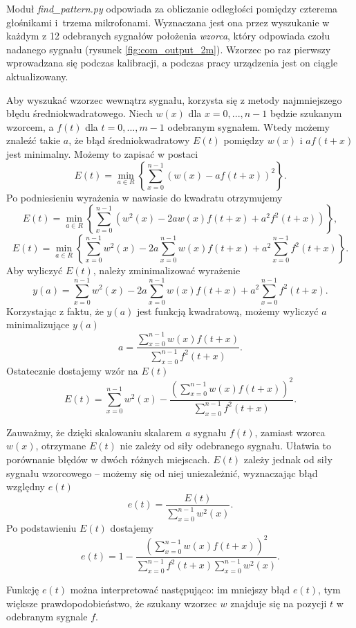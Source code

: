 Moduł \textit{find\_pattern.py} odpowiada za obliczanie odległości pomiędzy czterema głośnikami i~trzema mikrofonami.
Wyznaczana jest ona przez wyszukanie w każdym z 12 odebranych sygnałów  położenia \textit{wzorca}, który 
odpowiada czołu nadanego sygnału (rysunek \ref{fig:com_output_2m}).
Wzorzec po raz pierwszy wprowadzana się podczas kalibracji, a  
podczas pracy urządzenia jest on ciągle aktualizowany.

Aby wyszukać wzorzec wewnątrz sygnału, korzysta się z  metody najmniejszego błędu średniokwadratowego.
Niech $w(x)$  dla $x = 0, ..., n-1$ będzie szukanym wzorcem, a $f(t)$ dla $t = 0, ..., m-1$ odebranym sygnałem.
Wtedy możemy znaleźć takie $a$, że błąd średniokwadratowy $E(t)$ pomiędzy $w(x)$ i $a f(t+x)$ jest minimalny.
Możemy to zapisać w postaci
\[
  E(t) = \min_{a \in R} \left\{ \sum_{x=0}^{n-1}  \left( w(x) - a f(t+x) \right) ^2 \right\}.
\]
Po podniesieniu wyrażenia w nawiasie do kwadratu otrzymujemy
\[
  E(t) = \min_{a \in R} \left\{ \sum_{x=0}^{n-1}  \left( w^2(x) -2a w(x) f(t+x) + a^2 f^2(t+x) \right) \right\},
\]
\[
  E(t) = \min_{a \in R} \left\{ \sum_{x=0}^{n-1}  w^2(x) -2a \sum_{x=0}^{n-1}  w(x) f(t+x) + a^2 \sum_{x=0}^{n-1} f^2(t+x) \right\}.
\]
Aby wyliczyć $E(t)$, należy zminimalizować wyrażenie
\[
  y(a) = \sum_{x=0}^{n-1}  w^2(x) -2a \sum_{x=0}^{n-1}  w(x) f(t+x) + a^2 \sum_{x=0}^{n-1} f^2(t+x).
\]
Korzystając z faktu, że $y(a)$ jest funkcją kwadratową, możemy wyliczyć $a$ minimalizujące $y(a)$
\[
  a = \frac{ \sum\limits_{x=0}^{n-1}  w(x) f(t+x) }{ \sum\limits_{x=0}^{n-1} f^2(t+x) }.
\]
Ostatecznie dostajemy wzór na $E(t)$
\[
  E(t) = \sum_{x=0}^{n-1}  w^2(x)  - \frac {\left(\sum\limits_{x=0}^{n-1}  w(x) f(t+x) \right)^2 } { \sum\limits_{x=0}^{n-1} f^2(t+x)}.
\]

Zauważmy, że dzięki skalowaniu skalarem $a$  sygnału $f(t)$, zamiast wzorca $w(x)$,
otrzymane $E(t)$ nie zależy od siły odebranego sygnału. Ułatwia to porównanie błędów w dwóch różnych miejscach.
$E(t)$ zależy jednak od siły sygnału wzorcowego -- możemy się od niej uniezależnić, wyznaczając
błąd względny $e(t)$
\[
  e(t) = \frac{E(t)}{\sum\limits_{x=0}^{n-1}  w^2(x)}.
\]
Po podstawieniu $E(t)$ dostajemy
\[
  e(t) = 1 - \frac {\left(\sum\limits_{x=0}^{n-1}  w(x) f(t+x) \right)^2 } { \sum\limits_{x=0}^{n-1} f^2(t+x) \sum\limits_{x=0}^{n-1}  w^2(x)}.
\]
 
 Funkcję $e(t)$  można interpretować następująco:
 im mniejszy błąd $e(t)$, tym większe prawdopodobieństwo, że szukany wzorzec $w$ znajduje się na pozycji $t$ w 
 odebranym sygnale $f$. 

